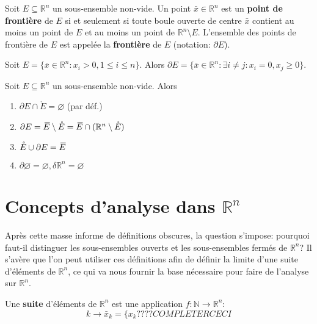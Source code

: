 \documentclass{report}
\newcommand*{\skol}[2][3]{{}\mkern#1mu\overline{\mkern-#1mu#2}} %
\newcommand*\adh[1]{\skol{#1}}
\newcommand*{\interior}[1]{\mathring{#1}}
\newcommand*{\frontier}[1]{\partial #1}
\begin{document}
\begin{defn}
	Soit $E \subseteq \mathbb R^n$ un sous-ensemble non-vide. Un point $\bar x \in \mathbb R^n$ est un \textbf{point de frontière} de $E$ si et seulement si toute boule ouverte de centre $\bar x$ contient au moins un point de $E$ et au moins un point de $\mathbb R^n \setminus E$. L'ensemble des points de frontière de $E$ est appelée la \textbf{frontière} de $E$ (notation: $\frontier E$).
\end{defn}

\begin{exmp}
	Soit $E = \{\bar x \in \mathbb R^n : x_i > 0, 1 \leq i \leq n\}$. Alors $\frontier E = \{\bar x \in \mathbb R^n : \exists i \neq j : x_i = 0, x_j \geq 0\}$.
\end{exmp}

\begin{thm}
	Soit $E \subseteq \mathbb R^n$ un sous-ensemble non-vide. Alors
	\begin{enumerate}
		\item $\frontier E \cap \interior E = \varnothing$ (par déf.)
		\item $\frontier E = \adh E \setminus \interior E = \adh E \cap (\mathbb R^n \setminus \interior E)$
		\item $\interior E \cup \frontier E = \adh E$
		\item $\frontier \varnothing = \varnothing, \delta \mathbb R^n = \varnothing$
	\end{enumerate}
\end{thm}

\section{Concepts d'analyse dans $\mathbb R^n$}
Après cette masse informe de définitions obscures, la question s'impose: pourquoi faut-il distinguer les sous-ensembles ouverts et les sous-ensembles fermés de $\mathbb R^n$? Il s'avère que l'on peut utiliser ces définitions afin de définir la limite d'une suite d'éléments de $\mathbb R^n$, ce qui va nous fournir la base nécessaire pour faire de l'analyse sur $\mathbb R^n$.

\begin{defn}
	Une \textbf{suite} d'éléments de $\mathbb R^n$ est une application $f : \mathbb N \to \mathbb R^n$:
	\begin{equation}
		k \to \bar x_k = \{x_k???? COMPLETER CECI
	\end{equation}
\end{defn}
\end{document}
